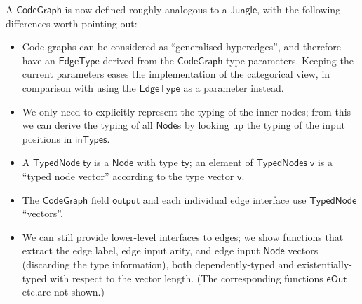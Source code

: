 \documentclass[copyright]{eptcs}
\newcommand{\Conid}[1]{\mathit{#1}}
\newcommand{\Varid}[1]{\mathit{#1}}
\renewcommand\Varid[1]{\mathord{\textsf{#1}}}
\let\Conid\Varid
\newcounter{x}
\newcounter{y}
\newcounter{z}
\begin{document}
\noindent
A \ensuremath{\Conid{CodeGraph}} is now defined roughly analogous to a \ensuremath{\Conid{Jungle}},
with the following differences worth pointing out:
\begin{itemize}
\item Code graphs can be considered as ``generalised hyperedges'',
  and therefore have an \ensuremath{\Conid{EdgeType}} derived from the \ensuremath{\Conid{CodeGraph}} type
  parameters. Keeping the current parameters eases the implementation
  of the categorical view, in comparison with using the \ensuremath{\Conid{EdgeType}} as
  a parameter instead.

\item We only need to explicitly represent the typing of the inner
  nodes; from this we can derive the typing of all \ensuremath{\Conid{Node}}s
  by looking up the typing of the input positions in \ensuremath{\Varid{inTypes}}.

\item A \ensuremath{\Conid{TypedNode}\;\Varid{ty}} is a \ensuremath{\Conid{Node}} with type \ensuremath{\Varid{ty}};
  an element of \ensuremath{\Conid{TypedNodes}\;\Varid{v}} is a ``typed node vector''
  according to the type vector \ensuremath{\Varid{v}}.

\item The \ensuremath{\Conid{CodeGraph}} field \ensuremath{\Varid{output}} and each individual edge
  interface use \ensuremath{\Conid{TypedNode}} ``vectors''.

\item We can still provide lower-level interfaces to edges;
  we show functions that extract the edge label,
  edge input arity,
  and edge input \ensuremath{\Conid{Node}} vectors (discarding the type information),
  both dependently-typed and existentially-typed with respect to the
  vector length.
  (The corresponding functions \ensuremath{\Varid{eOut}} etc.\null are not shown.)
\end{itemize}
\end{document}
